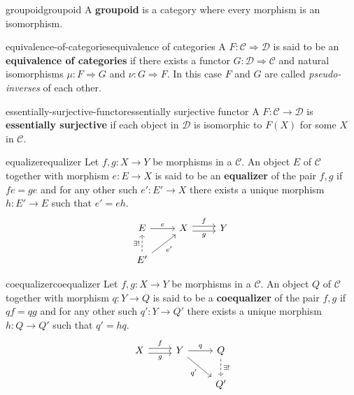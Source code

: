 \begin{topic}{groupoid}{groupoid}
    A \textbf{groupoid} is a category where every morphism is an isomorphism.
\end{topic}

\begin{topic}{equivalence-of-categories}{equivalence of categories}
    A  $F : \mathcal{C} \Rightarrow \mathcal{D}$ is said to be an \textbf{equivalence of categories} if there exists a functor $G : \mathcal{D} \Rightarrow \mathcal{C}$ and natural isomorphisms $\mu : F \Rightarrow G$ and $\nu : G \Rightarrow F$. In this case $F$ and $G$ are called \textit{pseudo-inverses} of each other.
\end{topic}

\begin{topic}{essentially-surjective-functor}{essentially surjective functor}
    A  $F : \mathcal{C} \to \mathcal{D}$ is \textbf{essentially surjective} if each object in $\mathcal{D}$ is isomorphic to $F(X)$ for some $X$ in $\mathcal{C}$.
\end{topic}

\begin{topic}{equalizer}{equalizer}
    Let $f, g : X \to Y$ be morphisms in a  $\mathcal{C}$. An object $E$ of $\mathcal{C}$ together with morphism $e : E \to X$ is said to be an \textbf{equalizer} of the pair $f, g$ if $fe = ge$ and for any other such $e' : E' \to X$ there exists a unique morphism $h : E' \to E$ such that $e' = eh$.
    \[ \begin{tikzcd} E \arrow{r}{e} & X \arrow[shift left=0.25em]{r}{f} \arrow[swap, shift right=0.25em]{r}{g} & Y \\ E' \arrow[dashed]{u}{\exists!} \arrow[swap]{ur}{e'} && \end{tikzcd} \]
\end{topic}

\begin{topic}{coequalizer}{coequalizer}
    Let $f, g : X \to Y$ be morphisms in a  $\mathcal{C}$. An object $Q$ of $\mathcal{C}$ together with morphism $q : Y \to Q$ is said to be a \textbf{coequalizer} of the pair $f, g$ if $qf = qg$ and for any other such $q' : Y \to Q'$ there exists a unique morphism $h : Q \to Q'$ such that $q' = hq$.
    \[ \begin{tikzcd} X \arrow[shift left=0.25em]{r}{f} \arrow[swap, shift right=0.25em]{r}{g} & Y \arrow{r}{q} \arrow[swap]{dr}{q'} & Q \arrow[dashed]{d}{\exists!} \\ && Q' \end{tikzcd} \]
\end{topic}

